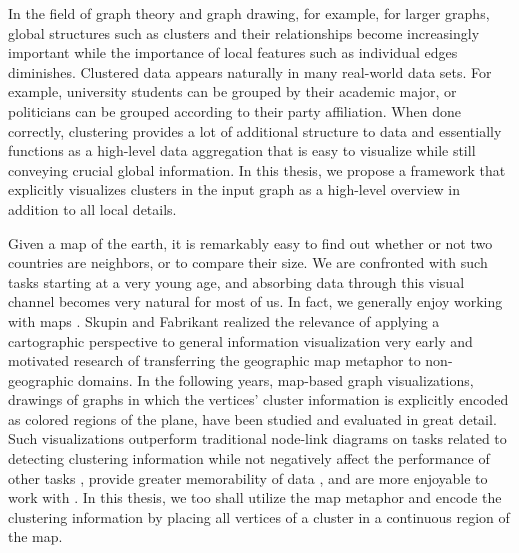 \label{sect:motivation}

In the field of graph theory and graph drawing, for example, for larger graphs, global structures such as clusters and their relationships become increasingly important while the importance of local features such as  individual edges diminishes.
Clustered data appears naturally in many real-world data sets.
For example, university students can be grouped by their academic major, or politicians can be grouped according to their party affiliation.
When done correctly, clustering provides a lot of additional structure to data and essentially functions as a high-level data aggregation that is easy to visualize while still conveying crucial global information.
In this thesis, we propose a framework that explicitly visualizes clusters in the input graph as a high-level overview in addition to all local details.

Given a map of the earth, it is remarkably easy to find out whether or not two countries are neighbors, or to compare their size.
We are confronted with such tasks starting at a very young age, and absorbing data through this visual channel becomes very natural for most of us.
In fact, we generally enjoy working with maps \cite{saket2016comparing}.
Skupin and Fabrikant \cite{skupin2003spatialization} realized the relevance of applying a cartographic perspective to general information visualization very early and motivated research of transferring the geographic map metaphor to non-geographic domains.
In the following years, map-based graph visualizations, \ie{} drawings of graphs in which the vertices' cluster information is explicitly encoded as colored regions of the plane, have been studied and evaluated in great detail.
Such visualizations outperform traditional node-link diagrams on tasks related to detecting clustering information while not negatively affect the performance of other tasks \cite{saket2014node}, provide greater memorability of data \cite{saket2015map}, and are more enjoyable to work with \cite{saket2016comparing}.
In this thesis, we too shall utilize the map metaphor and encode the clustering information by placing all vertices of a cluster in a continuous region of the map.


